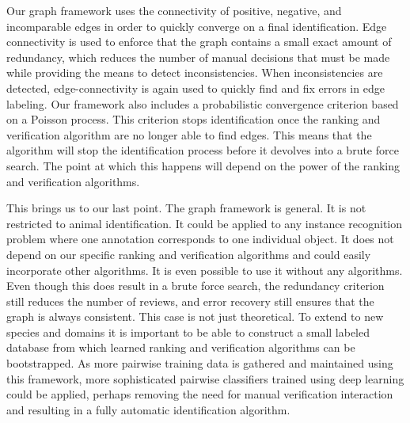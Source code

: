 

Our graph framework uses the connectivity of positive, negative, and incomparable edges in order to quickly
  converge on a final identification.
Edge connectivity is used to enforce that the graph contains a small exact amount of redundancy, which reduces
  the number of manual decisions that must be made while providing the means to detect inconsistencies.
When inconsistencies are detected, edge-connectivity is again used to quickly find and fix errors in edge
  labeling.
Our framework also includes a probabilistic convergence criterion based on a Poisson process.
This criterion stops identification once the ranking and verification algorithm are no longer able to find
  \meaningful{} edges.
This means that the algorithm will stop the identification process before it devolves into a brute force search.
The point at which this happens will depend on the power of the ranking and verification algorithms.

This brings us to our last point.
The graph framework is general.
It is not restricted to animal identification.
It could be applied to any instance recognition problem where one annotation corresponds to one individual
  object.
It does not depend on our specific ranking and verification algorithms and could easily incorporate other
  algorithms.
It is even possible to use it without any algorithms.
Even though this does result in a brute force search, the redundancy criterion still reduces the number of
  reviews, and error recovery still ensures that the graph is always consistent.
This case is not just theoretical.
To extend to new species and domains it is important to be able to construct a small labeled database from which
  learned ranking and verification algorithms can be bootstrapped.
As more pairwise training data is gathered and maintained using this framework, more sophisticated pairwise
  classifiers trained using deep learning could be applied, perhaps removing the need for manual verification
  interaction and resulting in a fully automatic identification algorithm.

